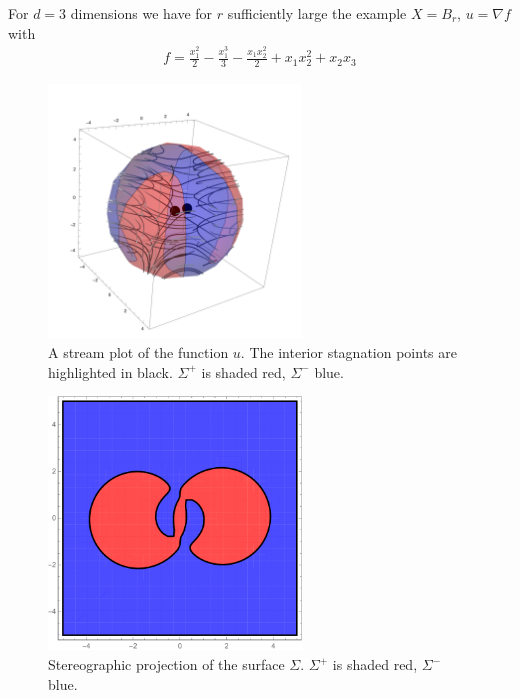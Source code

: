 \begin{frame}
  For $d=3$ dimensions we have for $r$ sufficiently large the example $X=B_r$, $u=\nabla f$ with
  \begin{align*}
    f=\frac{x_1^2}{2}-\frac{x_1^3}{3}-\frac{x_1x_2^2}{2}+x_1x_2^2+x_2x_3
  \end{align*}
\end{frame}

\begin{frame}
  \begin{figure}
    \centering
    \includegraphics[width=0.6\textwidth]{../plots/n3_hf_inflowOutflow_Ball_overview.pdf}
    \caption{A stream plot of the function $u$. The interior stagnation points are highlighted in black.
    $\Sigma^+$ is shaded red, $\Sigma^-$ blue.}
    \label{pl:n3_hf_inflowOutflowStagnationPoint_overview}
  \end{figure}
\end{frame}

\begin{frame}
  \begin{figure}
    \centering
    \includegraphics[width=0.6\textwidth]{../plots/n3_hf_inflowOutflow_Ball_Surface_2.pdf}
    \caption{Stereographic projection of the surface $\Sigma$. $\Sigma^+$ is shaded red, $\Sigma^-$ blue.}
    \label{pl:n3_hf_inflowOutflowStagnationPoint_Surface}
  \end{figure}
\end{frame}

